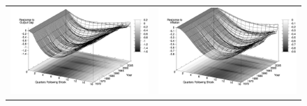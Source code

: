 \documentclass[10pt]{article}
\begin{document}
{\begin{figure}
\begin{tabular}{cc}
\includegraphics[scale=0.12]{images/Irf16_Output_Gap_Monetary_Policy_Shock.png} & \includegraphics[scale=0.12]{images/Irf16_Inflation_Monetary_Policy_Shock.png} 
\end{tabular}
\end{figure}

}
\end{document}
